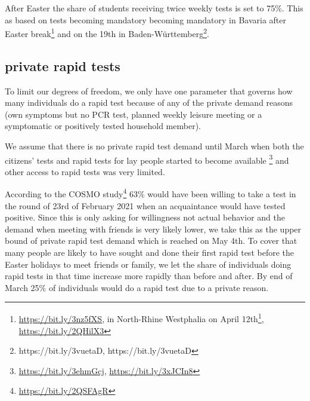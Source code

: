 After Easter the share of students receiving twice weekly tests is set to 75\%. This as
based on tests becoming mandatory becoming mandatory in Bavaria after Easter
break\footnote{\url{https://bit.ly/3nz5fXS}, in North-Rhine Westphalia
on April
12th\footnote{https://www.schulministerium.nrw/ministerium/schulverwaltung/schulmail-archiv/14042021-schulbetrieb-im-wechselunterricht-ab-montag},
\url{https://bit.ly/2QHilX3}} and on the 19th in
Baden-Württemberg\footnote{https://bit.ly/3vuetaD, https://bit.ly/3vuetaD}.

\subsection{private rapid tests}

To limit our degrees of freedom, we only have one parameter that governs how many
individuals do a rapid test because of any of the private demand reasons (own symptoms
but no PCR test, planned weekly leisure meeting or a symptomatic or positively tested
household member).

We assume that there is no private rapid test demand until March when both the citizens'
tests and rapid tests for lay people started to become available
\footnote{\url{https://bit.ly/3ehmGcj}, \url{https://bit.ly/3xJCIn8}} and other access to
rapid tests was very limited.

According to the COSMO study\footnote{\url{https://bit.ly/2QSFAgR}} 63\% would have been
willing to take a test in the round of 23rd of February 2021 when an acquaintance would
have tested positive. Since this is only asking for willingness not actual behavior and
the demand when meeting with friends is very likely lower, we take this as the upper
bound of private rapid test demand which is reached on May 4th. To cover that many people
are likely to have sought and done their first rapid test before the Easter holidays to
meet friends or family, we let the share of individuals doing rapid tests in that time
increase more rapidly than before and after. By end of March 25\% of individuals would do
a rapid test due to a private reason.

